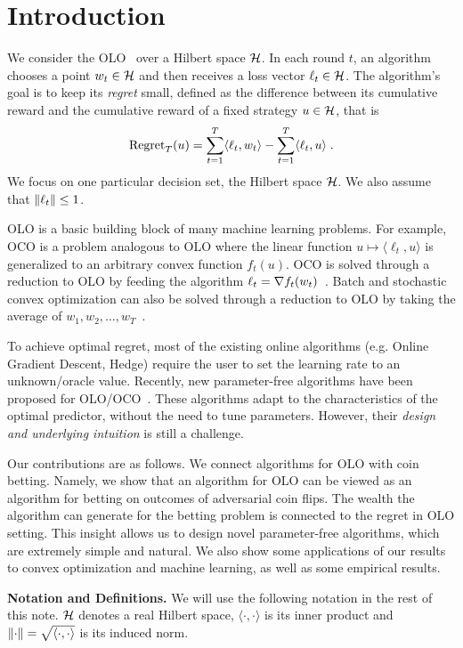 \section{Introduction}
\label{section:introduction}

We consider the \ac{OLO}~\citep{Cesa-Bianchi-Lugosi-2006, Shalev-Shwartz-2011}
over a Hilbert space $\mathcal{H}$. In each round $t$, an algorithm chooses a point $w_t
\in \mathcal{H}$ and then receives a loss vector $\ell_t \in \mathcal{H}$. The algorithm's goal is
to keep its \emph{regret} small, defined as the difference between its
cumulative reward and the cumulative reward of a fixed strategy $u \in \mathcal{H}$,
that is
\[
\operatorname{Regret}_T(u) = \sum_{t=1}^T \langle \ell_t, w_t \rangle - \sum_{t=1}^T \langle \ell_t, u \rangle  \; .
\]
We focus on one particular decision set, the Hilbert space $\mathcal{H}$.  We also assume
that $\left\|{\ell_t}\right\| \le 1$.

\ac{OLO} is a basic building block of many machine learning problems. For
example, \ac{OCO} is a problem analogous to \ac{OLO} where
the linear function $u \mapsto \langle \ell_t, u \rangle$
is generalized to an arbitrary convex function $f_t(u)$. \ac{OCO} is solved
through a reduction to \ac{OLO} by feeding the algorithm $\ell_t = \nabla
f_t(w_t)$~\citep{Shalev-Shwartz-2011}.  Batch and stochastic convex
optimization can also be solved through a reduction to \ac{OLO} by
taking the average of $w_1, w_2, \dots, w_T$~\citep{Shalev-Shwartz-2011}.

To achieve optimal regret, most of the existing online algorithms (e.g.  Online
Gradient Descent, Hedge) require the user to set the learning rate to an
unknown/oracle value. Recently, new parameter-free algorithms have been
proposed for \ac{OLO}/\ac{OCO}~\citep{Chaudhuri-Freund-Hsu-2009,
Chernov-Vovk-2010, Streeter-McMahan-2012, Orabona-2013, McMahan-Abernethy-2013,
McMahan-Orabona-2014, Luo-Schapire-2014, Orabona-2014, Luo-Schapire-2015, Koolen-van-Erven-2015}.  These algorithms adapt to the characteristics of the
optimal predictor, without the need to tune parameters. However, their
\emph{design and underlying intuition} is still a challenge.

Our contributions are as follows. We connect algorithms for \ac{OLO} with coin
betting. Namely, we show that an algorithm for \ac{OLO} can be viewed as an
algorithm for betting on outcomes of adversarial coin flips. The wealth the
algorithm can generate for the betting problem is connected to the regret in
\ac{OLO} setting. This insight allows us to design novel parameter-free
algorithms, which are extremely simple and natural. We also show some
applications of our results to convex optimization and machine learning, as well as some empirical results.

\noindent\textbf{Notation and Definitions.}
We will use the following notation in the rest of this note.  $\mathcal{H}$ denotes
a real Hilbert space, $\langle \cdot, \cdot \rangle$ is its inner product and
$\left\|{\cdot}\right\| = \sqrt{\langle \cdot, \cdot \rangle}$ is its induced norm.
